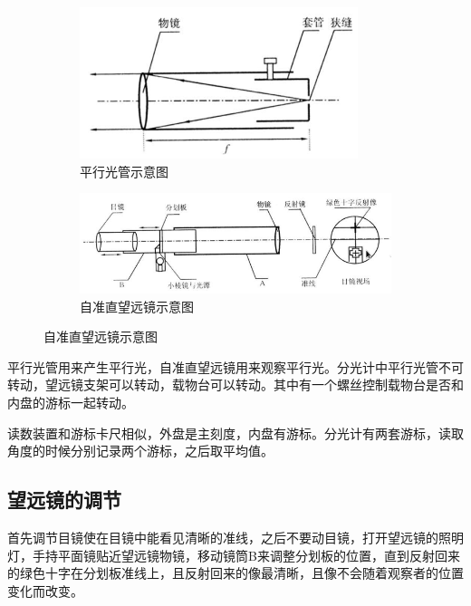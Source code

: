 \documentclass{article}
\begin{document}
\begin{figure}[H]
  \centering
  \begin{subfigure}{.35\textwidth}
    \centering
    \includegraphics[width=\linewidth]{figures/平行光管示意图}
    \caption{平行光管示意图}
  \end{subfigure}
  \begin{subfigure}{.6\textwidth}
    \centering
    \includegraphics[width=\linewidth]{figures/自准直望远镜示意图}
    \caption{自准直望远镜示意图}
  \end{subfigure}
\end{figure}

平行光管用来产生平行光，自准直望远镜用来观察平行光。分光计中平行光管不可转动，望远镜支架可以转动，载物台可以转动。其中有一个螺丝控制载物台是否和内盘的游标一起转动。

读数装置和游标卡尺相似，外盘是主刻度，内盘有游标。分光计有两套游标，读取角度的时候分别记录两个游标，之后取平均值。

\subsection{望远镜的调节}

首先调节目镜使在目镜中能看见清晰的准线，之后不要动目镜，打开望远镜的照明灯，手持平面镜贴近望远镜物镜，移动镜筒B来调整分划板的位置，直到反射回来的绿色十字在分划板准线上，且反射回来的像最清晰，且像不会随着观察者的位置变化而改变。
\end{document}
